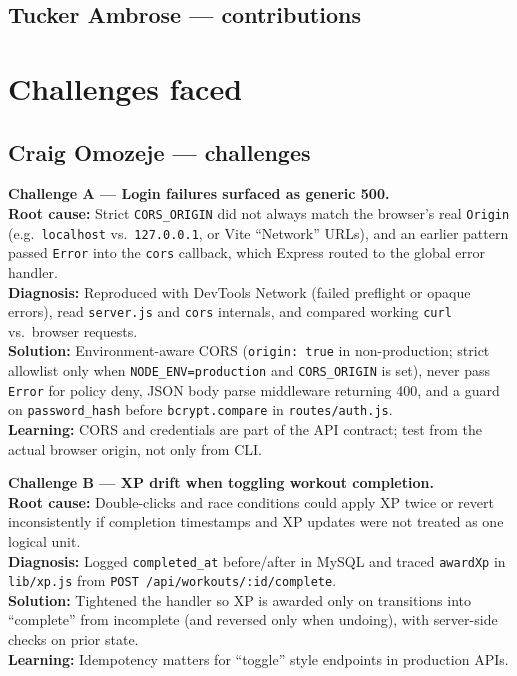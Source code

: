 \documentclass[11pt,letterpaper]{article}
\begin{document}
\subsection{Tucker Ambrose --- contributions}

\section{Challenges faced}

\subsection{Craig Omozeje --- challenges}
\textbf{Challenge A --- Login failures surfaced as generic 500.}\\
\textbf{Root cause:} Strict \texttt{CORS\_ORIGIN} did not always match the browser's real \texttt{Origin} (e.g.\ \texttt{localhost} vs.\ \texttt{127.0.0.1}, or Vite ``Network'' URLs), and an earlier pattern passed \texttt{Error} into the \texttt{cors} callback, which Express routed to the global error handler.\\
\textbf{Diagnosis:} Reproduced with DevTools Network (failed preflight or opaque errors), read \texttt{server.js} and \texttt{cors} internals, and compared working \texttt{curl} vs.\ browser requests.\\
\textbf{Solution:} Environment-aware CORS (\texttt{origin: true} in non-production; strict allowlist only when \texttt{NODE\_ENV=production} and \texttt{CORS\_ORIGIN} is set), never pass \texttt{Error} for policy deny, JSON body parse middleware returning 400, and a guard on \texttt{password\_hash} before \texttt{bcrypt.compare} in \texttt{routes/auth.js}.\\
\textbf{Learning:} CORS and credentials are part of the API contract; test from the actual browser origin, not only from CLI.

\vspace{0.6em}
\textbf{Challenge B --- XP drift when toggling workout completion.}\\
\textbf{Root cause:} Double-clicks and race conditions could apply XP twice or revert inconsistently if completion timestamps and XP updates were not treated as one logical unit.\\
\textbf{Diagnosis:} Logged \texttt{completed\_at} before/after in MySQL and traced \texttt{awardXp} in \texttt{lib/xp.js} from \texttt{POST /api/workouts/:id/complete}.\\
\textbf{Solution:} Tightened the handler so XP is awarded only on transitions into ``complete'' from incomplete (and reversed only when undoing), with server-side checks on prior state.\\
\textbf{Learning:} Idempotency matters for ``toggle'' style endpoints in production APIs.
\end{document}
